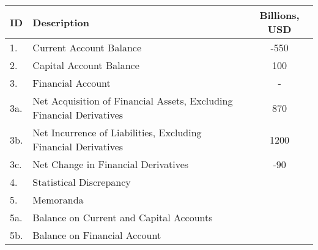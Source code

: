 \begin{table}[ht]
    \centering
    \begin{tabular}{llc}
    \toprule
    ID & Description & Billions, USD \\
    \midrule
    1. & Current Account Balance & -550 \\
    2. & Capital Account Balance & 100 \\
    3. & Financial Account & - \\
    3a. & Net Acquisition of Financial Assets, Excluding Financial Derivatives & 870 \\
    3b. & Net Incurrence of Liabilities, Excluding Financial Derivatives & 1200 \\
    3c. & Net Change in Financial Derivatives & -90 \\
    4. & Statistical Discrepancy & \\
    5. & Memoranda & \\
    5a. & Balance on Current and Capital Accounts & \\
    5b. & Balance on Financial Account & \\
    \bottomrule
    \end{tabular}
    \end{table}